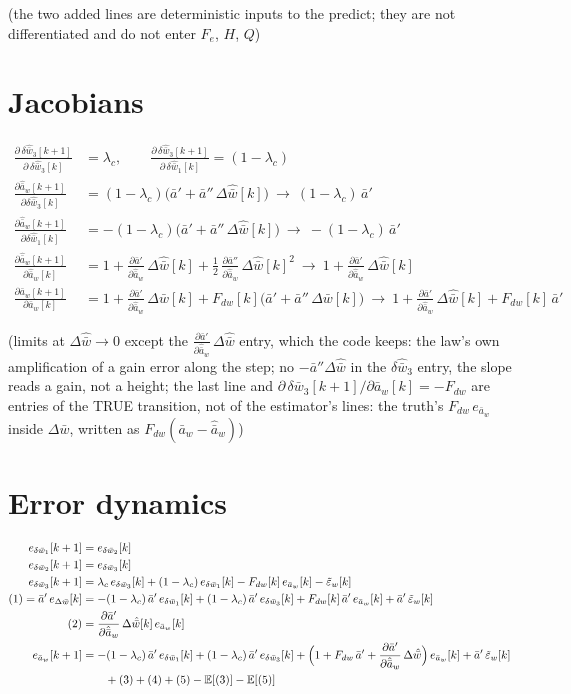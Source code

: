\documentclass[11pt,a4paper,fontset=none]{ctexart}
\newcommand{\ba}{\bar{a}}
\newcommand{\bw}{\bar{w}}
\newcommand{\E}{\mathbb{E}}
\newcommand{\dW}{\Delta\bw}
\newcommand{\dWh}{\Delta\hat{\bw}}
\newcommand{\eD}{e_{\Delta\bw}}
\newcommand{\ap}{\ba'}
\newcommand{\app}{\ba''}
\newcommand{\et}{\tilde{\varepsilon}_w}
\newcommand{\dap}{\frac{\partial\ap}{\partial\hat{\ba}_w}}
\begin{document}
(the two added lines are deterministic inputs to the predict; they are not differentiated and do not enter $F_e$, $H$, $Q$)

\section{Jacobians}

\begin{align*}
\frac{\partial\,\delta\hat{\bw}_3[k+1]}{\partial\,\delta\hat{\bw}_3[k]} &= \lambda_c , \qquad
\frac{\partial\,\delta\hat{\bw}_3[k+1]}{\partial\,\delta\hat{\bw}_1[k]} = (1-\lambda_c) \\
\frac{\partial \hat{\ba}_w[k+1]}{\partial \delta\hat{\bw}_3[k]}
  &= (1-\lambda_c)\bigl(\ap + \app\,\dWh[k]\bigr)
  \ \to\ (1-\lambda_c)\,\ap \\
\frac{\partial \hat{\ba}_w[k+1]}{\partial \delta\hat{\bw}_1[k]}
  &= -(1-\lambda_c)\bigl(\ap + \app\,\dWh[k]\bigr)
  \ \to\ -(1-\lambda_c)\,\ap \\
\frac{\partial \hat{\ba}_w[k+1]}{\partial \hat{\ba}_w[k]}
  &= 1 + \dap\,\dWh[k] + \tfrac{1}{2}\,\frac{\partial\app}{\partial\hat{\ba}_w}\,\dWh[k]^{2}
  \ \to\ 1 + \dap\,\dWh[k] \\
\frac{\partial \ba_w[k+1]}{\partial \ba_w[k]}
  &= 1 + \dap\,\dW[k] + F_{dw}[k]\bigl(\ap + \app\,\dW[k]\bigr)
  \ \to\ 1 + \dap\,\dWh[k] + F_{dw}[k]\,\ap
\end{align*}

(limits at $\dWh \to 0$ except the $\dap\,\dWh$ entry, which the code keeps: the law's own amplification of a gain error along the step;
no $-\app\dWh$ in the $\delta\hat{\bw}_3$ entry, the slope reads a gain, not a height;
the last line and $\partial\,\delta\bw_3[k+1]/\partial\ba_w[k] = -F_{dw}$ are entries of the TRUE transition, not of the estimator's lines:
the truth's $F_{dw}\,e_{\ba_w}$ inside $\dW$, written as $F_{dw}(\ba_w - \hat{\ba}_w)$)

\section{Error dynamics}

\begin{align*}
e_{\delta\bw_1}[k+1] &= e_{\delta\bw_2}[k] \\
e_{\delta\bw_2}[k+1] &= e_{\delta\bw_3}[k] \\
e_{\delta\bw_3}[k+1] &= \lambda_c\,e_{\delta\bw_3}[k] + (1-\lambda_c)\,e_{\delta\bw_1}[k] - F_{dw}[k]\,e_{\ba_w}[k] - \et[k] \\
(1) = \ap\,\eD[k] &= -(1-\lambda_c)\,\ap\,e_{\delta\bw_1}[k] + (1-\lambda_c)\,\ap\,e_{\delta\bw_3}[k] + F_{dw}[k]\,\ap\,e_{\ba_w}[k] + \ap\,\et[k] \\
(2) &= \dap\,\dWh[k]\,e_{\ba_w}[k] \\
e_{\ba_w}[k+1]       &= -(1-\lambda_c)\,\ap\,e_{\delta\bw_1}[k]
                      + (1-\lambda_c)\,\ap\,e_{\delta\bw_3}[k]
                      + \Bigl(1 + F_{dw}\,\ap + \dap\,\dWh\Bigr)\,e_{\ba_w}[k]
                      + \ap\,\et[k] \\
                     &\qquad + (3) + (4) + (5) - \E[(3)] - \E[(5)]
\end{align*}
\end{document}
